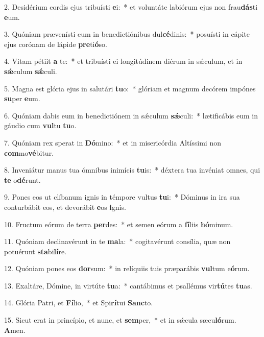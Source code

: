 2. Desidérium cordis ejus tribuísti \textbf{e}i:~*  et voluntáte labiórum ejus non frau\textbf{dás}ti \textbf{e}um.\

3. Quóniam prævenísti eum in benedictiónibus dul\textbf{cé}dinis:~*  posuísti in cápite ejus corónam de lápide \textbf{pre}ti\textbf{ó}so.\

4. Vitam pétiit \textbf{a} te:~*  et tribuísti ei longitúdinem diérum in sǽculum, et in \textbf{sǽ}culum \textbf{sǽ}culi.\

5. Magna est glória ejus in salutári \textbf{tu}o:~*  glóriam et magnum decórem impónes \textbf{su}per \textbf{e}um.\

6. Quóniam dabis eum in benedictiónem in sǽculum \textbf{sǽ}culi:~*  lætificábis eum in gáudio cum \textbf{vul}tu \textbf{tu}o.\

7. Quóniam rex sperat in \textbf{Dó}mino:~*  et in misericórdia Altíssimi non \textbf{com}mo\textbf{vé}bitur.\

8. Inveniátur manus tua ómnibus inimícis \textbf{tu}is:~*  déxtera tua invéniat omnes, qui \textbf{te} o\textbf{dé}runt.\

9. Pones eos ut clíbanum ignis in témpore vultus \textbf{tu}i:~*  Dóminus in ira sua conturbábit eos, et devorábit \textbf{e}os \textbf{i}gnis.\

10. Fructum eórum de terra \textbf{per}des:~*  et semen eórum a \textbf{fí}liis \textbf{hó}minum.\

11. Quóniam declinavérunt in te \textbf{ma}la:~*  cogitavérunt consília, quæ non potuérunt \textbf{sta}bi\textbf{lí}re.\

12. Quóniam pones eos \textbf{dor}sum:~*  in relíquiis tuis præparábis \textbf{vul}tum e\textbf{ó}rum.\

13. Exaltáre, Dómine, in virtúte \textbf{tu}a:~*  cantábimus et psallémus vir\textbf{tú}tes \textbf{tu}as.\

14. Glória Patri, et \textbf{Fí}lio,~*  et Spi\textbf{rí}tui \textbf{Sanc}to.\

15. Sicut erat in princípio, et nunc, et \textbf{sem}per,~*  et in sǽcula sæcu\textbf{ló}rum. \textbf{A}men.\

